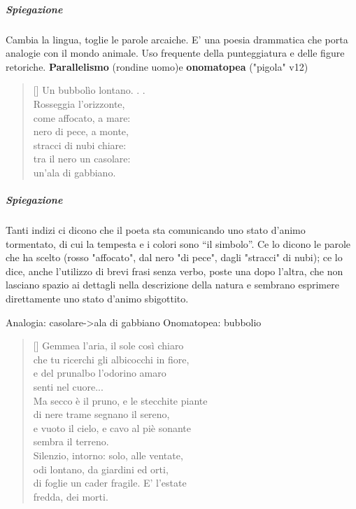 \documentclass[10pt]{report}
\begin{document}
		\subparagraph[X Agosto]{Spiegazione}Cambia la lingua, toglie le parole arcaiche.
		E' una poesia drammatica che porta analogie con il mondo animale. 
		Uso frequente della punteggiatura e delle figure retoriche.
		\textbf{Parallelismo} (rondine uomo)e \textbf{onomatopea} ("pigola" v12)
		
		

		
		\renewcommand{\poemtoc}{subsection}
		\settowidth{\versewidth}{There was an old party of Lyme}
		
		\begin{verse}[\versewidth]
				Un bubbolìo lontano. . .\\			
			
			Rosseggia l’orizzonte,\\			
			come affocato, a mare:\\		
			nero di pece, a monte,\\			
			stracci di nubi chiare:\\			
			tra il nero un casolare:\\			
			un’ala di gabbiano.\\
			
		\end{verse}
		
		\subparagraph[Temporale]{Spiegazione}
		Tanti indizi ci dicono che il poeta sta comunicando uno stato d'animo tormentato, di cui la tempesta e i  colori sono “il simbolo”. Ce lo dicono le parole che ha scelto (rosso "affocato", dal nero "di pece", dagli "stracci" di nubi); ce lo dice, anche  l’utilizzo di brevi frasi senza verbo, poste una dopo l'altra, che non lasciano spazio ai dettagli nella descrizione della natura e sembrano esprimere direttamente uno stato d'animo sbigottito.
		
		Analogia: casolare->ala di gabbiano
		Onomatopea: bubbolio
		
		\renewcommand{\poemtoc}{subsection}
		\settowidth{\versewidth}{There was an old party of Lyme}
		
		\begin{verse}[\versewidth]
			Gemmea l'aria, il sole così chiaro\\
			che tu ricerchi gli albicocchi in fiore,\\
			e del prunalbo l'odorino amaro\\
			senti nel cuore...\\
			Ma secco è il pruno, e le stecchite piante\\
			di nere trame segnano il sereno,\\
			e vuoto il cielo, e cavo al piè sonante\\
			sembra il terreno.\\
			Silenzio, intorno: solo, alle ventate,\\
			odi lontano, da giardini ed orti,\\
			di foglie un cader fragile. E' l'estate\\
			fredda, dei morti.\\
			
		\end{verse}
		
\end{document}
